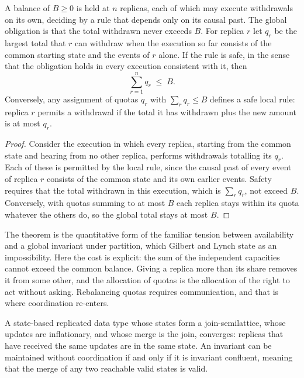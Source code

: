\begin{newresult}\label{thm:quota}
A balance of $B\ge0$ is held at $n$ replicas, each of which may execute withdrawals on its own, deciding by a rule that depends only on its causal past. The global obligation is that the total withdrawn never exceeds $B$. For replica $r$ let $q_r$ be the largest total that $r$ can withdraw when the execution so far consists of the common starting state and the events of $r$ alone. If the rule is safe, in the sense that the obligation holds in every execution consistent with it, then
\[
\sum_{r=1}^{n}q_r\;\le\;B.
\]
Conversely, any assignment of quotas $q_r$ with $\sum_rq_r\le B$ defines a safe local rule: replica $r$ permits a withdrawal if the total it has withdrawn plus the new amount is at most $q_r$.
\end{newresult}
\begin{proof}
Consider the execution in which every replica, starting from the common state and hearing from no other replica, performs withdrawals totalling its $q_r$. Each of these is permitted by the local rule, since the causal past of every event of replica $r$ consists of the common state and its own earlier events. Safety requires that the total withdrawn in this execution, which is $\sum_rq_r$, not exceed $B$. Conversely, with quotas summing to at most $B$ each replica stays within its quota whatever the others do, so the global total stays at most $B$.
\end{proof}

The theorem is the quantitative form of the familiar tension between availability and a global invariant under partition, which Gilbert and Lynch state as an impossibility. Here the cost is explicit: the sum of the independent capacities cannot exceed the common balance. Giving a replica more than its share removes it from some other, and the allocation of quotas is the allocation of the right to act without asking. Rebalancing quotas requires communication, and that is where coordination re-enters.

\begin{established}\label{prop:crdt}
A state-based replicated data type whose states form a join-semilattice, whose updates are inflationary, and whose merge is the join, converges: replicas that have received the same updates are in the same state. An invariant can be maintained without coordination if and only if it is invariant confluent, meaning that the merge of any two reachable valid states is valid.
\end{established}

